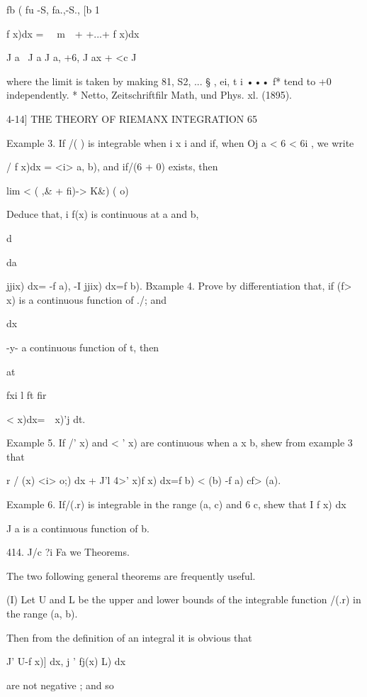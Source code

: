 fb ( fu -S, fa.,-S., [b 1

f x)dx = \ \ m\ \ + +...+ f x)dx\,

J a \ J a J a, +6, J ax + <c J

where the limit is taken by making 81, S2, ... § , ei, t i ••• f* tend
to +0 independently. * Netto, Zeitschriftfilr Math, und Phys. xl.
(1895).



4-14] THE THEORY OF RIEMANX INTEGRATION 65

Example 3. If /( ) is integrable when i x i and if, when Oj a < 6 < 6i
, we write

/ f x)dx = <i> a, b), and if/(6 + 0) exists, then



lim < ( ,\& + fi)-> K\&) ( o)

Deduce that, i f(x) is continuous at a and b,

d\

da



jjix) dx= -f a), -I jjix) dx=f b). Bxample 4. Prove by differentiation
that, if (f> x) is a continuous function of ./; and



dx

-y- a continuous function of t, then

at



fxi l ft fir

 < x)dx=\ \ x)'j dt.



Example 5. If /' x) and < ' x) are continuous when a x b, shew from
example 3 that

r / (x) <i> o;) dx + J'l 4>' x)f x) dx=f b) < (b) -f a) cf> (a).

Example 6. If/(.r) is integrable in the range (a, c) and 6 c, shew
that I f x) dx

J a is a continuous function of b.

414. J/c ?i Fa we Theorems.

The two following general theorems are frequently useful.

(I) Let U and L be the upper and lower bounds of the integrable
function /(.r) in the range (a, b).

Then from the definition of an integral it is obvious that

J' U-f x)] dx, j ' fj(x) L) dx

are not negative ; and so

